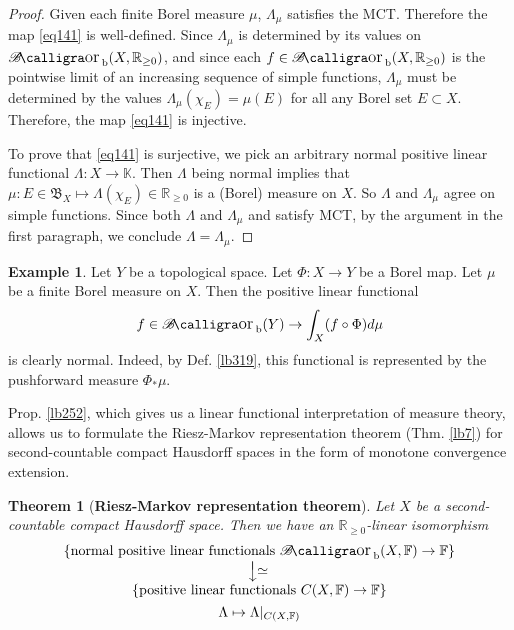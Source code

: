 \documentclass[12pt,b5paper,notitlepage]{article}
\theoremstyle{definition}
\newtheorem{eg}[df]{Example}
\theoremstyle{plain}
\newtheorem{thm}[df]{Theorem}
\DeclareMathOperator{\Borb}{{\mathscr{B}\text{\kern -2pt {\calligra\large or}}\,}_{\mathrm b}}
\newcommand{\fk}{\mathfrak}
\newcommand{\Kbb}{\mathbb K}
\newcommand{\Rbb}{\mathbb R}
\newcommand{\Fbb}{\mathbb F}
\numberwithin{equation}{section}
\begin{document}
\begin{proof}
Given each finite Borel measure $\mu$, $\Lambda_\mu$ satisfies the MCT. Therefore the map \eqref{eq141} is well-defined. Since $\Lambda_\mu$ is determined by its values on $\Borb(X,\Rbb_{\geq0})$, and since each $f\in\Borb(X,\Rbb_{\geq0})$ is the pointwise limit of an increasing sequence of simple functions, $\Lambda_\mu$ must be determined by the values $\Lambda_\mu(\chi_E)=\mu(E)$ for all any Borel set $E\subset X$. Therefore, the map \eqref{eq141} is injective.

To prove that \eqref{eq141} is surjective, we pick an arbitrary normal positive linear functional $\Lambda:X\rightarrow\Kbb$. Then $\Lambda$ being normal implies that $\mu:E\in\fk B_X\mapsto \Lambda(\chi_E)\in\Rbb_{\geq0}$ is a (Borel) measure on $X$. So $\Lambda$ and $\Lambda_\mu$ agree on simple functions. Since both $\Lambda$ and $\Lambda_\mu$ and satisfy MCT, by the argument in the first paragraph, we conclude $\Lambda=\Lambda_\mu$.
\end{proof}


\begin{eg}\label{lb318}
Let $Y$ be a topological space. Let $\Phi:X\rightarrow Y$ be a Borel map. Let $\mu$ be a finite Borel measure on $X$. Then the positive linear functional
\begin{align*}
f\in\Borb(Y)\rightarrow \int_X (f\circ\Phi)d\mu
\end{align*}
is clearly normal. Indeed, by Def. \ref{lb319}, this functional is represented by the pushforward measure $\Phi_*\mu$.
\end{eg}


Prop. \ref{lb252}, which gives us a linear functional interpretation of measure theory, allows us to formulate the Riesz-Markov representation theorem (Thm. \ref{lb7}) for second-countable compact Hausdorff spaces in the form of monotone convergence extension.


\begin{thm}[\textbf{Riesz-Markov representation theorem}]\label{lb253} 
Let $X$ be a second-countable compact Hausdorff space. Then we have an $\Rbb_{\geq0}$-linear isomorphism
\begin{gather}
\begin{gathered}
\begin{array}{c}
\{\text{normal positive linear functionals $\Borb(X,\Fbb)\rightarrow\Fbb$}\}\\
\raisebox{0.3cm}{\rotatebox{-90}{$\xlongrightarrow{\rotatebox{90}{$\simeq$}}$}}\\
\{\text{positive linear functionals $C(X,\Fbb)\rightarrow\Fbb$}\}
\end{array}
\\
\Lambda\mapsto\Lambda|_{C(X,\Fbb)}
\end{gathered}
\end{gather}
\end{thm} 
\end{document}
